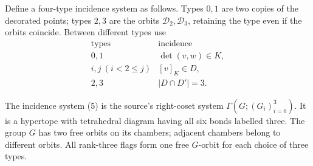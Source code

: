Define a four-type incidence system as follows. Types $0,1$ are
two copies of the decorated points; types $2,3$ are the orbits
$\mathcal D_2,\mathcal D_3$, retaining the type even if the orbits
coincide. Between different types use
\[
\begin{array}{c|l}
\text{types}&\text{incidence}\\\hline
0,1&\det(v,w)\in K,\\
i,j\ (i<2\le j)&[v]_K\in D,\\
2,3&|D\cap D'|=3.
\end{array}                                                     \tag{5}
\]

\begin{theorem}\label{full-geometry}
The incidence system (5) is the source's right-coset system
$\Gamma(G;(G_i)_{i=0}^3)$. It is a hypertope with tetrahedral
diagram having all six bonds labelled three. The group $G$ has
two free orbits on its chambers; adjacent chambers belong to
different orbits. All rank-three flags form one free $G$-orbit
for each choice of three types.
\end{theorem}
